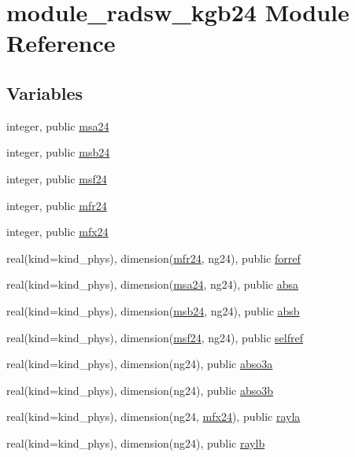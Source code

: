 \hypertarget{namespacemodule__radsw__kgb24}{}\section{module\+\_\+radsw\+\_\+kgb24 Module Reference}
\label{namespacemodule__radsw__kgb24}
\subsection*{Variables}
\begin{DoxyCompactItemize}
\item 
integer, public \hyperlink{namespacemodule__radsw__kgb24_ad416df05aed8a6ae1ecd57d5c90c223c}{msa24}
\item 
integer, public \hyperlink{group__module__radsw__main_ga0ec09b4df9fbfa868844ad93a84cbe31}{msb24}
\item 
integer, public \hyperlink{group__module__radsw__main_ga52d0fde0af1d5427acf0d1924f393cdc}{msf24}
\item 
integer, public \hyperlink{group__module__radsw__main_ga3a1c3808493ce89f2218116a02350e51}{mfr24}
\item 
integer, public \hyperlink{group__module__radsw__main_ga6fcafb0e1605ad49a252ed1e22b00a5b}{mfx24}
\item 
real(kind=kind\+\_\+phys), dimension(\hyperlink{group__module__radsw__main_ga3a1c3808493ce89f2218116a02350e51}{mfr24}, ng24), public \hyperlink{group__module__radsw__main_gac57357ab300edcbad8f7b3801b796af3}{forref}
\item 
real(kind=kind\+\_\+phys), dimension(\hyperlink{namespacemodule__radsw__kgb24_ad416df05aed8a6ae1ecd57d5c90c223c}{msa24}, ng24), public \hyperlink{group__module__radsw__main_ga06965ec156c4e1d18d50a70ba43bd8e1}{absa}
\item 
real(kind=kind\+\_\+phys), dimension(\hyperlink{group__module__radsw__main_ga0ec09b4df9fbfa868844ad93a84cbe31}{msb24}, ng24), public \hyperlink{group__module__radsw__main_gabd4db3c9678fee17f2cfd4a3e290619a}{absb}
\item 
real(kind=kind\+\_\+phys), dimension(\hyperlink{group__module__radsw__main_ga52d0fde0af1d5427acf0d1924f393cdc}{msf24}, ng24), public \hyperlink{group__module__radsw__main_ga784e78b5964fadd3e3e1f57f7af30802}{selfref}
\item 
real(kind=kind\+\_\+phys), dimension(ng24), public \hyperlink{group__module__radsw__main_ga3df78e9baa46df182aad6ff9b1662dc4}{abso3a}
\item 
real(kind=kind\+\_\+phys), dimension(ng24), public \hyperlink{group__module__radsw__main_ga6b44aa0637523aa1f78de5b4d16c693b}{abso3b}
\item 
real(kind=kind\+\_\+phys), dimension(ng24, \hyperlink{group__module__radsw__main_ga6fcafb0e1605ad49a252ed1e22b00a5b}{mfx24}), public \hyperlink{group__module__radsw__main_gab24774576414b5d210c34916c3d19404}{rayla}
\item 
real(kind=kind\+\_\+phys), dimension(ng24), public \hyperlink{group__module__radsw__main_ga927fc4a43727d3e0735448c1cdc60458}{raylb}
\end{DoxyCompactItemize}


